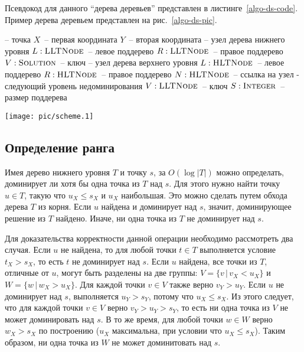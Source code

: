 Псевдокод для данного ``дерева деревьев'' представлен в листинге~\ref{algo-ds-code}.
Пример дерева деревьем представлен на рис.~\ref{algo-ds-pic}.
\begin{algorithm}[H]
\begin{algorithmic}[1]
    \State -- точка
    \State $X$~-- первая координата
    \State $Y$~-- вторая координата
\EndStructure
{}
    \State -- узел дерева нижнего уровня
    \State $L: \textsc{LLTNode}$~-- левое поддерево
    \State $R: \textsc{LLTNode}$~-- правое поддерево
    \State $V: \textsc{Solution}$~-- ключ
\EndStructure
{}
    \State -- узел дерева верхнего уровня
    \State $L: \textsc{HLTNode}$~-- левое поддерево
    \State $R: \textsc{HLTNode}$~-- правое поддерево
    \State $N: \textsc{HLTNode}$~-- ссылка на узел - следующий уровень недоминирования
    \State $V: \textsc{LLTNode}$~-- ключ
    \State $S: \textsc{Integer}$~-- размер поддерева
\EndStructure
\end{algorithmic}
\caption{Псевдокод структур данных, используемых в разрабатываемом алгоритме}\label{algo-ds-code}
\end{algorithm}

\begin{figure*}[!t]
\centering
\texttt{[image: pic/scheme.1]}
\caption{
Предложенная структура данных~-- ``дерево деревьев''. 
Узлы ``дерева верхнего уровня'' соответствуют уровням недоминирования.
Каждый уровень недоминирования представлен в виде ``дерева нижнего уровня'',
узлы которого упорядочены по первой координате. В каждом узле ``дерева верхнего уровня'' 
дополнительно хранится размер поддерева (на рисунке - числа в скобках).
}\label{algo-ds-pic}
\end{figure*}

\subsection{Определение ранга}
\label{algo-lookup}
Имея дерево нижнего уровня $T$ и точку $s$, за $O(\log |T|)$ можно определать, доминирует ли 
хотя бы одна точка из $T$ над $s$. Для этого нужно найти точку $u \in T$, такую что 
$u_X \le s_X$ и $u_X$ наибольшая. Это можно сделать путем обхода дерева $T$ из корня. Если
$u$ найдена и доминирует над $s$, значит, доминирующее решение из $T$ найдено. Иначе,
ни одна точка из $T$ не доминирует над $s$.

Для доказательства корректности данной операции необходимо рассмотреть два случая. Если $u$ не найдена, 
то для любой точки $t \in T$ выполняется условие $t_X > s_X$, то есть $t$ не доминирует над $s$.
Если $u$ найдена, все точки из $T$, отличные от $u$, могут быть разделены на две группы: 
$V = \{ v\,|\,v_X < u_X \}$ и $W = \{ w\,|\,w_X > u_X \}$.
Для каждой точки $v \in V$ также верно $v_Y > u_Y$. Если $u$ не доминирует над $s$, 
выполняется $u_Y > s_Y$, потому что $u_X \le s_X$. Из этого следует, что для каждой точки 
$v \in V$ верно $v_Y > u_Y > s_Y$, то есть ни одна точка из $V$ не может доминировать над $s$. 
В то же время, для любой точки $w \in W$ верно $w_X > s_X$ по построению ($u_X$ максимальна,
при условии что $u_X \le s_X$). Таким образом, ни одна точка из $W$ не может доминитовать над $s$.

